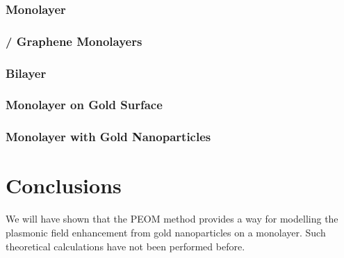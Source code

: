 \documentclass[11pt]{report}
\begin{document}
\subsection{\mos Monolayer}
\subsection{\mos / Graphene Monolayers}
\subsection{\mos Bilayer}
\subsection{\mos Monolayer on Gold Surface}
\subsection{\mos Monolayer with Gold Nanoparticles}

\clearpage
\chapter{Conclusions}
We will have shown that the PEOM method provides a way for modelling the
plasmonic field enhancement from gold nanoparticles on a \mos monolayer. Such
theoretical calculations have not been performed before.

\clearpage

\end{document}
